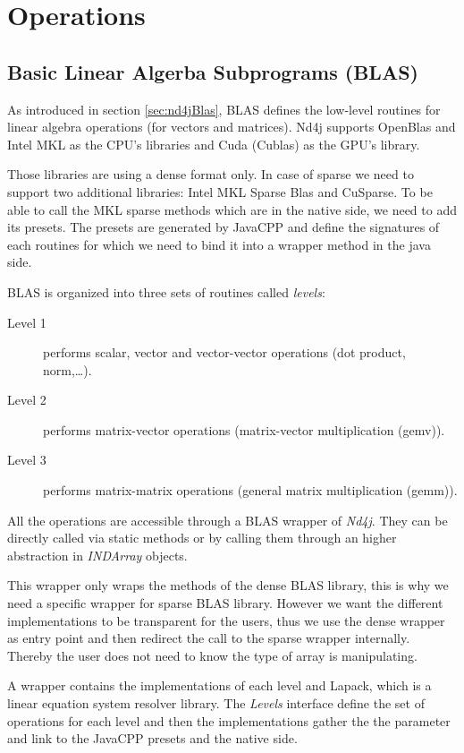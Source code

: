 \chapter{Operations}

\section{Basic Linear Algerba Subprograms (BLAS)}
As introduced in section \ref{sec:nd4jBlas}, BLAS defines the low-level routines for linear algebra operations (for vectors and matrices). Nd4j supports OpenBlas and Intel MKL as the CPU's libraries and Cuda (Cublas) as the GPU's library.

Those libraries are using a dense format only. In case of sparse we need to support two additional libraries: Intel MKL Sparse Blas and CuSparse. To be able to call the MKL sparse methods which are in the native side, we need to add its presets. The presets are generated by JavaCPP and define the signatures of each routines for which we need to bind it into a wrapper method in the java side.

BLAS is organized into three sets of routines called \textit{levels}:
\begin{description}
	\item [Level 1] performs scalar, vector and vector-vector operations (dot product, norm,\dots).
	\item [Level 2] performs matrix-vector operations (matrix-vector multiplication (gemv)).
	\item [Level 3] performs matrix-matrix operations (general matrix multiplication (gemm)).
\end{description} 
 
 All the operations are accessible through a BLAS wrapper of \textit{Nd4j}. They can be directly called via static methods or by calling them through an higher abstraction in \textit{INDArray} objects.
 
 This wrapper only wraps the methods of the dense BLAS library, this is why we need a specific wrapper for sparse BLAS library. However we want the different implementations to be transparent for the users, thus we use the dense wrapper as entry point and then redirect the call to the sparse wrapper internally. Thereby the user does not need to know the type of array is manipulating.
 
 A wrapper contains the implementations of each level and Lapack, which is a linear equation system resolver library. The \textit{Levels} interface define the set of operations for each level and then the implementations gather the the parameter and link to the JavaCPP presets and the native side.
 
